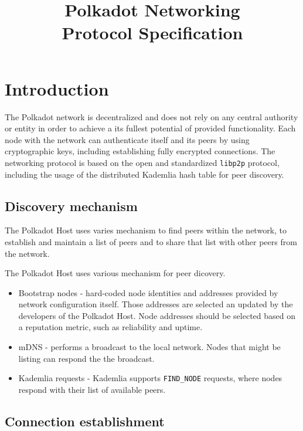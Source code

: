 \documentclass{book}
\begin{document}
\title{{\Huge Polkadot Networking}\\
    {\Large Protocol Specification}}

\date{}
\maketitle
\tableofcontents
\newpage

\section{Introduction}

The Polkadot network is decentralized and does not rely on any central authority
or entity in order to achieve a its fullest potential of provided functionality.
Each node with the network can authenticate itself and its peers by using
cryptographic keys, including establishing fully encrypted connections. The
networking protocol is based on the open and standardized \verb|libp2p|
protocol, including the usage of the distributed Kademlia hash table for peer
discovery.

\subsection{Discovery mechanism}

The Polkadot Host uses varies mechanism to find peers within the network, to
establish and maintain a list of peers and to share that list with other peers
from the network.
\newline

The Polkadot Host uses various mechanism for peer dicovery.

\begin{itemize}
    \item Bootstrap nodes - hard-coded node identities and addresses provided by
    network configuration itself. Those addresses are selected an updated by the
    developers of the Polkadot Host. Node addresses should be selected based on
    a reputation metric, such as reliability and uptime.
    \item mDNS - performs a broadcast to the local network. Nodes that might be
    listing can respond the the broadcast.
    \item Kademlia requests - Kademlia supports \verb|FIND_NODE| requests, where
    nodes respond with their list of available peers.
\end{itemize}

\subsection{Connection establishment}
\end{document}
